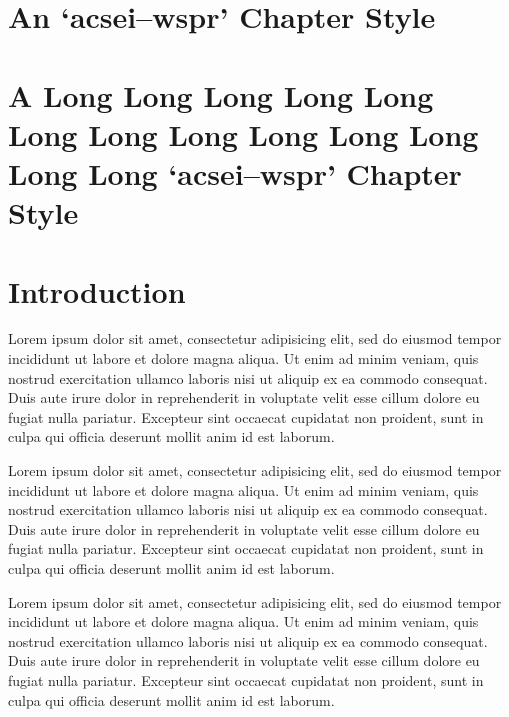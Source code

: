 \documentclass[10pt,a4paper,extrafontsizes,oldfontcommands,oneside]{memoir}
\begin{document}


\chapter{An `acsei--wspr' Chapter Style} %
\label{chap:a_acsei_chapter_style}



\chapter{A Long Long Long Long Long Long Long Long Long Long Long Long Long `acsei--wspr' Chapter Style} %
\label{chap:a_long_acsei_chapter_style}




\chapter{Introduction}

Lorem ipsum dolor sit amet, consectetur adipisicing elit, sed do eiusmod tempor incididunt ut labore et dolore magna aliqua. Ut enim ad minim veniam, quis nostrud exercitation ullamco laboris nisi ut aliquip ex ea commodo consequat. Duis aute irure dolor in reprehenderit in voluptate velit esse cillum dolore eu fugiat nulla pariatur. Excepteur sint occaecat cupidatat non proident, sunt in culpa qui officia deserunt mollit anim id est laborum.

Lorem ipsum dolor sit amet, consectetur adipisicing elit, sed do eiusmod tempor incididunt ut labore et dolore magna aliqua. Ut enim ad minim veniam, quis nostrud exercitation ullamco laboris nisi ut aliquip ex ea commodo consequat. Duis aute irure dolor in reprehenderit in voluptate velit esse cillum dolore eu fugiat nulla pariatur. Excepteur sint occaecat cupidatat non proident, sunt in culpa qui officia deserunt mollit anim id est laborum.

Lorem ipsum dolor sit amet, consectetur adipisicing elit, sed do eiusmod tempor incididunt ut labore et dolore magna aliqua. Ut enim ad minim veniam, quis nostrud exercitation ullamco laboris nisi ut aliquip ex ea commodo consequat. Duis aute irure dolor in reprehenderit in voluptate velit esse cillum dolore eu fugiat nulla pariatur. Excepteur sint occaecat cupidatat non proident, sunt in culpa qui officia deserunt mollit anim id est laborum.
\end{document}

